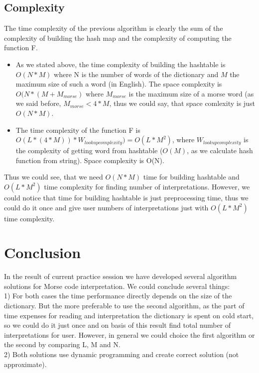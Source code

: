 \documentclass[a4paper]{article}
\begin{document}
\subsection{Complexity}
The time complexity of the previous algorithm is clearly the sum of the complexity of building the hash map and the complexity of computing the function F.\\
\begin{itemize}
    \item As we stated above, the time complexity of building the hashtable is $O(N * M)$ where N is the number of words of the dictionary and $M$ the maximum size of such a word (in English).
      The space complexity is $ O(N * (M + M_{morse}) $ where $M_{morse}$ is the maximum size of a morse word (as we said before, $M_{morse} < 4 * M$, thus we could say, that space comlexity is just $ O(N * M)$.
    \item The time complexity of the function F is $O(L * (4 * M)) * W_{lookup complexity}) = O(L * M^2)$, where $W_{lookup complexity}$ is the complexity of getting word from hashtable ($O(M)$, as we calculate hash function from string). Space complexity is O(N).
\end{itemize}
Thus we could see, that we need $ O(N * M)$ time for building hashtable and $O(L * M^2)$ time complexity for finding number of interpretations. However, we could notice that time for building hashtable is just preprocessing time, thus we could do it once and give user numbers of interpretations just with  $O(L * M^2)$ time complexity.





\section{Conclusion}

In the result of current practice session we have developed several algorithm solutions for Morse code interpretation.  We could conclude several things:\\
1) For both cases the time performance directly depends on the size of the dictionary. But the more preferable to use the second algorithm, as the part of time expenses for reading and interpretation the dictionary is spent on cold start, so we could do it just once and on basis of this result find total number of interpretations for user. However, in general we could choice the first algorithm or the second by comparing L, M and N.\\
2) Both solutions use dynamic programming and create correct solution (not approximate).\\
\end{document}
